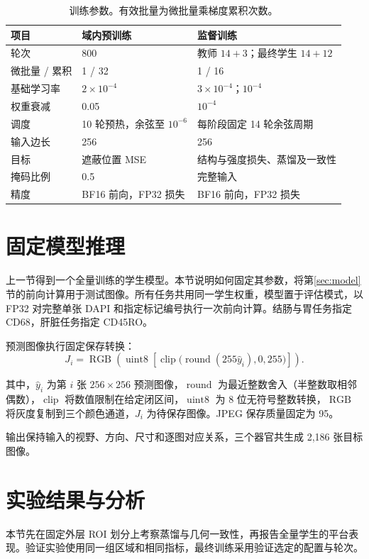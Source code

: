 \documentclass[UTF8,a4paper,zihao=5,fontset=fandol]{ctexart}
\newcommand{\op}[1]{\operatorname{#1}}
\newcommand{\sym}[1]{\par\nobreak\noindent\begin{minipage}{\linewidth}#1\end{minipage}\par}
\begin{document}
\begin{table}[H]\centering\small
\caption{训练参数。有效批量为微批量乘梯度累积次数。}\label{tab:training}
\begin{tabularx}{\linewidth}{lYY}\toprule
项目 & 域内预训练 & 监督训练\\\midrule
轮次 &800&教师 $14+3$；最终学生 $14+12$\\
微批量 / 累积 &1 / 32&1 / 16\\
基础学习率 &$2\times10^{-4}$&$3\times10^{-4}$；$10^{-4}$\\
权重衰减 &0.05&$10^{-4}$\\
调度 &10 轮预热，余弦至 $10^{-6}$&每阶段固定 14 轮余弦周期\\
输入边长 &256&256\\
目标 &遮蔽位置 MSE&结构与强度损失、蒸馏及一致性\\
掩码比例 &0.5&完整输入\\
精度 &BF16 前向，FP32 损失&BF16 前向，FP32 损失\\\bottomrule
\end{tabularx}
\end{table}

\FloatBarrier
\section{固定模型推理}\label{sec:inference}
上一节得到一个全量训练的学生模型。本节说明如何固定其参数，将第\ref{sec:model}节的前向计算用于测试图像。所有任务共用同一学生权重，模型置于评估模式，以 FP32 对完整单张 DAPI 和指定标记编号执行一次前向计算。结肠与胃任务指定 CD68，肝脏任务指定 CD45RO。

预测图像执行固定保存转换：
\begin{equation}
J_i=\op{RGB}\left(\op{uint8}\left[
\op{clip}\bigl(\op{round}(255\hat y_i),0,255\bigr)\right]\right).
\label{eq:save}
\end{equation}
\sym{其中，$\hat y_i$ 为第 $i$ 张 $256\times256$ 预测图像，$\op{round}$ 为最近整数舍入（半整数取相邻偶数），$\op{clip}$ 将数值限制在给定闭区间，$\op{uint8}$ 为 8 位无符号整数转换，$\op{RGB}$ 将灰度复制到三个颜色通道，$J_i$ 为待保存图像。JPEG 保存质量固定为 95。}
输出保持输入的视野、方向、尺寸和逐图对应关系，三个器官共生成 2,186 张目标图像。

\FloatBarrier
\section{实验结果与分析}\label{sec:results}
本节先在固定外层 ROI 划分上考察蒸馏与几何一致性，再报告全量学生的平台表现。验证实验使用同一组区域和相同指标，最终训练采用验证选定的配置与轮次。
\end{document}
